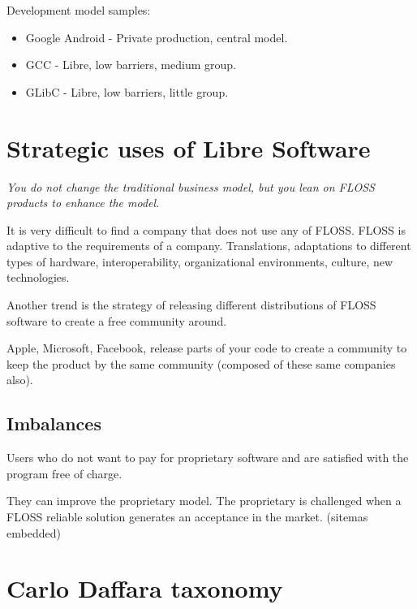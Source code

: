 Development model samples:
\begin{itemize}
  \item Google Android - Private production, central model.
  \item GCC - Libre, low barriers, medium group.
  \item GLibC - Libre, low barriers, little group.
\end{itemize}

\section{Strategic uses of Libre Software}

\emph{You do not change the traditional business model, but you lean on FLOSS
 products to enhance the model.}

It is very difficult to find a company that does not use any of FLOSS. 
FLOSS is adaptive to the requirements of a company. 
Translations, adaptations to different types of hardware, interoperability, 
organizational environments, culture, new technologies.

Another trend is the strategy of releasing different distributions of
FLOSS software to create a free community around.

Apple, Microsoft, Facebook, release parts of your code to create a community to 
keep the product by the same community (composed of these same companies also).

\subsection{Imbalances}

Users who do not want to pay for proprietary software and are satisfied with 
the program free of charge.

They can improve the proprietary model. The proprietary is challenged when a 
FLOSS reliable solution generates an acceptance in the market. (sitemas embedded)

\section{Carlo Daffara taxonomy}

